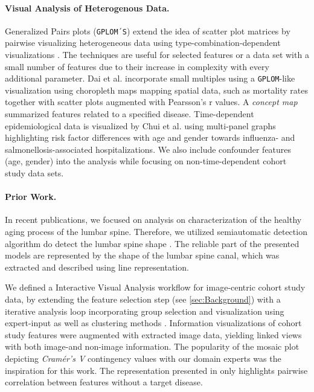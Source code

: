 \documentclass[journal]{style/vgtc} 			          %
\begin{document}
\paragraph{Visual Analysis of Heterogenous Data.}
Generalized Pairs plots (\texttt{GPLOM´S}) extend the idea of scatter plot matrices by pairwise visualizing heterogeneous data using type-combination-dependent visualizations \cite{GPLOMS, Francois2013}.
The techniques are useful for selected features or a data set with a small number of features due to their increase in complexity with every additional parameter.
Dai et al. \cite{Dai2005} incorporate small multiples using a \texttt{GPLOM}-like visualization using choropleth maps mapping spatial data, such as mortality rates together with scatter plots augmented with Pearsson's r values.
A \emph{concept map} summarized features related to a specified disease.
Time-dependent epidemiological data is visualized by Chui et al. \cite{Chui2011} using multi-panel graphs highlighting risk factor differences with age and gender towards influenza- and salmonellosis-associated hospitalizations.
We also include confounder features (age, gender) into the analysis while focusing on non-time-dependent cohort study data sets.
\paragraph{Prior Work.}
In recent publications, we focused on analysis on characterization of the healthy aging process of the lumbar spine.
Therefore, we utilized semiautomatic detection algorithm do detect the lumbar spine shape \cite{Klemm2013VMV}.
The reliable part of the presented models are represented by the shape of the lumbar spine canal, which was extracted and described using line representation.

We defined a Interactive Visual Analysis workflow for image-centric cohort study data, by extending the feature selection step (see \ref{sec:Background}) with a iterative analysis loop incorporating group selection and visualization using expert-input as well as clustering methods \cite{Klemm2014VIS}.
Information visualizations of cohort study features were augmented with extracted image data, yielding linked views with both image-and non-image information.
The popularity of the mosaic plot depicting \emph{Cram\'{e}r's V} contingency values with our domain experts was the inspiration for this work.
The representation presented in \cite{Klemm2014VIS} only highlights pairwise correlation between features without a target disease.
\end{document}
